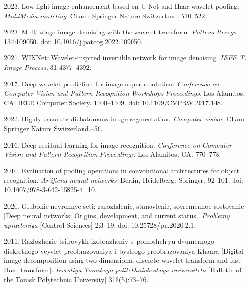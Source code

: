 \begin{multicols}{2}
{{\begin{thebibliography}{99}
     2023.
    Low-light image enhancement based on U-Net and Haar wavelet pooling. 
    \textit{MultiMedia modeling}.  Cham: Springer Nature Switzerland.  510--522.
  
     2023.
    Multi-stage image denoising with the wavelet transform. \textit{Pattern
    Recogn.} 134:109050. doi: 10.1016/j.patcog.2022.109050.
    
     2021. WINNet: Wavelet-inspired
    invertible network for image denoising. \textit{IEEE T. Image Process.} 
31:4377--4392.
    
     2017.
    Deep wavelet prediction for image super-resolution. \textit{Conference on
    Computer Vision and Pattern Recognition Workshops Proceedings}.  Los Alamitos, CA: IEEE Computer Society. 
    1100--1109. doi: 10.1109/CVPRW.2017.148.
   
     2022.
    Highly accurate dichotomous image segmentation. \textit{Computer vision}.
     Cham: Springer Nature Switzerland.--56.
    
     2016.
    Deep residual learning for image recognition. \textit{Conference on
    Computer Vision and Pattern Recognition Proceedings}.  Los Alamitos, CA.  770--778.
   
     2010.
    Evaluation of pooling operations in convolutional architectures for object recognition.
    \textit{Artificial neural networks}.  Berlin, Heidelberg: Springer.  92--101. doi: 10.1007/978-3-642-15825-4\_10.
    
     2020.
    Glubokie neyronnye seti: zarozhdenie, stanovlenie, sovremennoe sostoyanie
    [Deep neural networks: Origins, development, and current status]. 
\textit{Problemy upravleniya} [Control Sciences] 2:3--19. doi: 10.25728/pu.2020.2.1.

\columnbreak
    
     2011. Razlozhenie tsifrovykh 
    izobrazheniy s~po\-moshch'yu dvumernogo diskretnogo veyvlet-preobrazovaniya i~bystrogo preobrazovaniya 
    Khaara
    [Digital image decomposition using two-dimensional discrete wavelet transform and fast Haar transform].
\textit{Izvestiya Tomskogo politekhnicheskogo universiteta} [Bulletin of the Tomsk Polytechnic University] 318(5):73--76.
  

\end{thebibliography}}}
\end{multicols}
